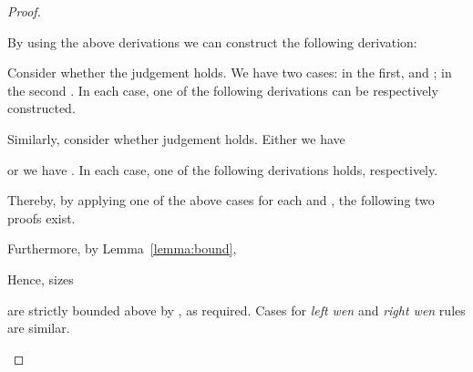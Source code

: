 \begin{proof}
\begin{enumerate}[label=\textbf{\Alph*},ref=\Alph*,leftmargin=*]
\begin{enumerate}[label*=\textbf{.\arabic*}]
By using the above derivations we can construct the following derivation:

\begin{comment}
We aim now to establish  and
.
\end{comment}

\noindent Consider whether the judgement  holds.
We have two cases: in the first,  and ; in the second . In each case, one of the following derivations can be respectively constructed.

Similarly, consider whether judgement  holds.
Either we have 

or we have . In each case, one of the following derivations holds, respectively.

Thereby, by applying one of the above cases for each  and , 
the following two proofs exist.
\begin{comment}

\end{comment}

Furthermore, by Lemma~\ref{lemma:bound}, 

Hence, sizes

are strictly bounded above by 
, as required.
Cases for \textit{left wen} and \textit{right wen} rules are similar.
\begin{comment}
There are three similar principal case for \textit{seq} that do not correspond to cases in \textsf{MAV}~\cite{Horne2015}, induced by the \textit{suspend}, \textit{left wen} and \textit{right wen} rules.
We present here only the case induced by \textit{suspend}.
Consider the case where the bottommost rule of a proof is a \textit{suspend} rule that interferes with the \textit{seq} connective to which splitting is applied as follows.

In the above, it is assumed that  and also ,  and .
Hence, by induction, there exist  and  such that  and , for ,
and -ary killing context  such that the following derivation holds.
.
Furthermore the size of the proof of  is bounded by the size of the proof of .

By induction again, there exist  and  such that  and , for , and -ary killing context  such that the following derivation holds.
.
Furthermore, the size of the proof of  is bounded by the size of the proof of . 

Since , by Lemma~\ref{lemma:nfv}, . By appling the induction hypothesis again, there exist  and  such that  and either  or , for , and -ary killing context  such that 
.
Furthermore, the size of the proof of  is bounded above by the size of the proof of .


\end{comment}
\end{enumerate}
\end{enumerate}
\end{proof}
